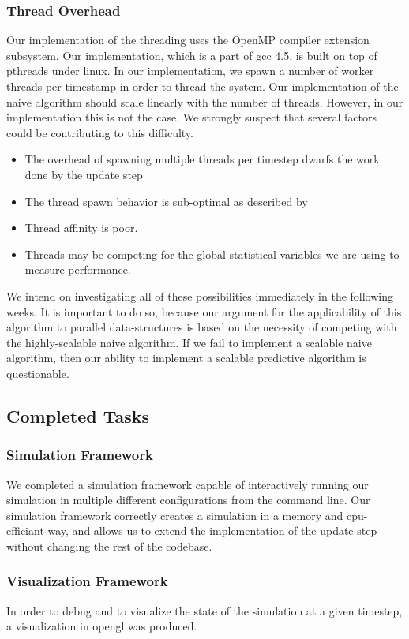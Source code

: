 \documentclass[conference]{IEEEtran}
\begin{document}
\subsubsection{Thread Overhead}
	Our implementation of the threading uses the OpenMP compiler extension subsystem.  Our implementation, which is a part of gcc 4.5, is built on top of pthreads under linux.  In our implementation, we 
spawn a number of worker threads per timestamp in order to thread the system.  Our implementation of the naive algorithm should scale linearly with the number of threads.  However, in our implementation this is not the case.  We strongly suspect that
several factors could be contributing to this difficulty.  

\begin{itemize}
	\item The overhead of spawning multiple threads per timestep dwarfs the work done by the update step
	\item The thread spawn behavior is sub-optimal as described by \cite{performance-critical}
	\item Thread affinity is poor.
	\item Threads may be competing for the global statistical variables we are using to measure performance.
\end{itemize}

We intend on investigating all of these possibilities immediately in the following weeks.  It is important to do so, because our argument for the applicability of this algorithm to parallel data-structures
is based on the necessity of competing with the highly-scalable naive algorithm.  If we fail to implement a scalable naive algorithm, then our ability to implement a scalable predictive algorithm is questionable.

\subsection{Completed Tasks}
\subsubsection{Simulation Framework}
We completed a simulation framework capable of interactively running our simulation in multiple different configurations from the command line.  Our simulation framework correctly
creates a simulation in a memory and cpu-efficiant way, and allows us to extend the implementation of the update step without changing the rest of the codebase.
\subsubsection{Visualization Framework}
In order to debug and to visualize the state of the simulation at a given timestep, a visualization in opengl was produced.
\end{document}

